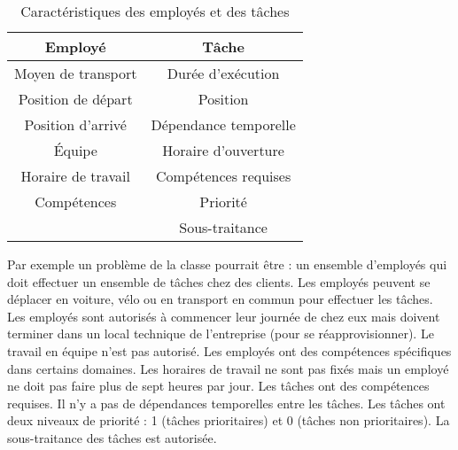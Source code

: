 \begin{comment}
\item Sous-traitance (Out-sourcing) : la sous-traitance n'est pas défini comme critère dans \cite{Castillo2016} mais elle est assez récurrente dans la littérature des \wsrp. On peut accepter de faire certaines tâches grâce à la sous-traitance mais cela à un coût.
\end{itemize}


\rod{améliorer l'écriture de cette partie. Faire une ou plusieurs figures synthétiques}
\gab{C'est qu'un premier jet}
\end{comment}





\begin{table}[H]

\centering
\begin{tabular}{|c|c|}
\hline
Employé & Tâche\\
\hline
Moyen de transport  & Durée d'exécution \\
Position de départ & Position\\
 Position d'arrivé & Dépendance temporelle\\
 Équipe& Horaire d'ouverture\\
Horaire de travail  & Compétences requises\\
Compétences  & Priorité\\
 ~&Sous-traitance\\
\hline

\end{tabular}
\caption{\label{CharEmploy}Caractéristiques des employés et des tâches}
\end{table}

Par exemple un problème de la classe pourrait être : un ensemble d'employés qui doit effectuer un ensemble de tâches chez des clients. Les employés peuvent se déplacer en voiture, vélo ou en transport en commun pour effectuer les tâches. Les employés sont autorisés à commencer leur journée de chez eux mais doivent terminer dans un local technique de l'entreprise (pour se réapprovisionner). Le travail en équipe n'est pas autorisé. Les employés ont des compétences spécifiques dans certains domaines. Les horaires de travail ne sont pas fixés mais un employé ne doit pas faire plus de sept heures par jour. Les tâches ont des compétences requises. Il n'y a pas de dépendances temporelles entre les tâches. Les tâches ont deux niveaux de priorité : 1 (tâches prioritaires) et 0 (tâches non prioritaires). La sous-traitance des tâches est autorisée.



